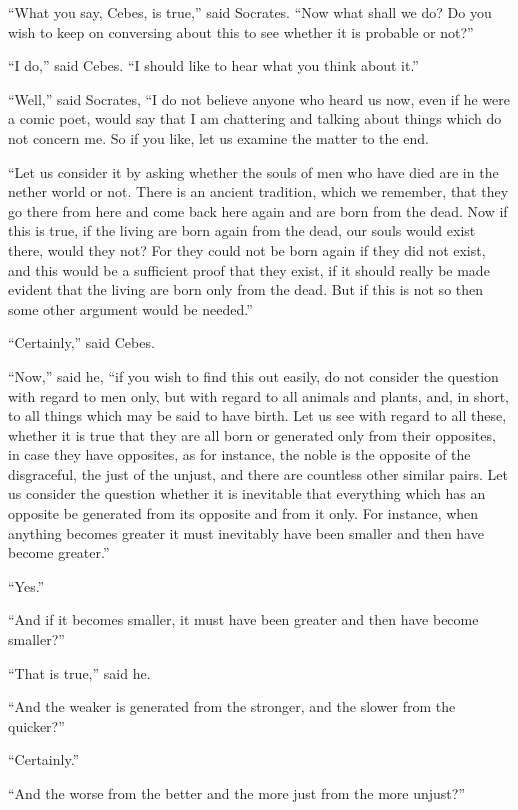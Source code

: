 \documentclass[letterpaper,12pt]{article}
\newcommand{\stephpag}[1]{\marginnote{\small\itshape\fontfamily{ppl}\selectfont #1}}
\begin{document}
\begin{drama}
``What you say, Cebes, is true,'' said Socrates. ``Now what shall we do? Do you wish to keep on conversing about this to see whether it is probable or not?''
 
``I do,'' said Cebes. ``I should like to hear what you think about it.''
 
``Well,'' said Socrates, ``I do not believe anyone who heard us now, \stephpag{c} even if he were a comic poet, would say that I am chattering and talking about things which do not concern me. So if you like, let us examine the matter to the end.
 
``Let us consider it by asking whether the souls of men who have died are in the nether world or not. There is an ancient tradition, which we remember, that they go there from here and come back here again and are born from the dead. Now if this is true, if the living are born again from the dead, our souls would exist there, \stephpag{d} would they not? For they could not be born again if they did not exist, and this would be a sufficient proof that they exist, if it should really be made evident that the living are born only from the dead. But if this is not so then some other argument would be needed.''
 
``Certainly,'' said Cebes.
 
``Now,'' said he, ``if you wish to find this out easily, do not consider the question with regard to men only, but with regard to all animals and plants, and, in short, to all things which may be said to have birth. Let us see with regard to all these, whether it is true that they are all born or generated \stephpag{e} only from their opposites, in case they have opposites, as for instance, the noble is the opposite of the disgraceful, the just of the unjust, and there are countless other similar pairs. Let us consider the question whether it is inevitable that everything which has an opposite be generated from its opposite and from it only. For instance, when anything becomes greater it must inevitably have been smaller and then have become greater.''
 
``Yes.''
 
``And if it becomes smaller, \stephpag{71 a} it must have been greater and then have become smaller?''
 
``That is true,'' said he.
 
``And the weaker is generated from the stronger, and the slower from the quicker?''
 
``Certainly.''
 
``And the worse from the better and the more just from the more unjust?''
 

\end{drama}
\end{document}
